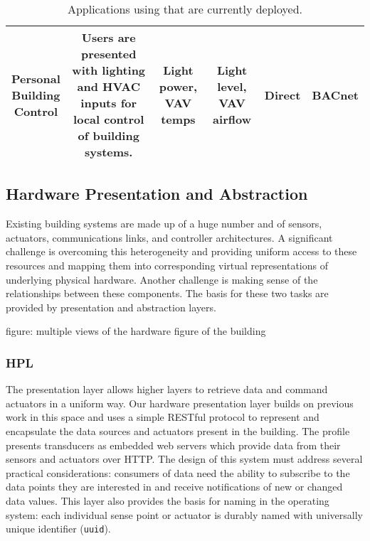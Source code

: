 \begin{table*}[t!h]
\begin{tabular}[width=0.98\textwidth]{c|c|c|c|c|c}
\hline

\shortstack{Personal \\Building \\Control} &
\shortstack{Users are presented with lighting \\and HVAC inputs for local control \\of building systems.} &
\shortstack{Light power, \\VAV temps} &
\shortstack{Light level, \\VAV airflow} &
Direct &
BACnet \\

\hline
\end{tabular}
\caption{Applications using \implname that are currently deployed.}
\label{table:apps}
\end{table*}

\subsection{Hardware Presentation and Abstraction}

Existing building systems are made up of a huge number and of sensors, actuators, communications links, and controller architectures.  A significant challenge is overcoming this heterogeneity and providing uniform access to these resources and mapping them into corresponding virtual representations of underlying physical hardware.  Another challenge is making sense of the relationships between these components.  The basis for these two tasks are provided by presentation and abstraction layers.

figure: multiple views of the hardware figure of the building

\subsubsection{HPL}

The presentation layer allows higher layers to retrieve data and command actuators in a uniform way.  Our hardware presentation layer builds on previous work in this space and uses a simple RESTful protocol to  represent and encapsulate the data sources and actuators present in the building.  The profile presents transducers as embedded web servers which provide data from their sensors and actuators over HTTP.  The design of this system must address several practical considerations: consumers of data need the ability to subscribe to the data points they are interested in and receive notifications of new or changed data values.  %
This layer also provides the basis for naming in the operating system: each individual sense point or actuator is durably named with universally unique identifier ({\tt uuid}).

